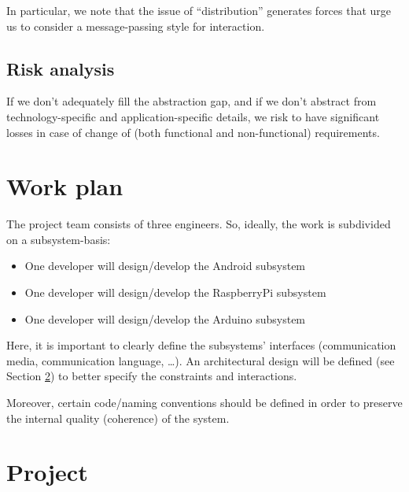 \documentclass{article}
\newcommand{\labelsec}[1]{\label{sec:#1}}
\begin{document}
In particular, we note that the issue of ``distribution'' generates forces that
urge us to consider a message-passing style for
interaction.

\subsection{Risk analysis}

  If we don't adequately fill the abstraction gap, and if we don't abstract
  from technology-specific and application-specific details, we risk to have
  significant losses in case of change of (both functional and non-functional) requirements.
  

\section{Work plan}
\labelsec{wplan}

The project team consists of three engineers. So, ideally, the work is
subdivided on a subsystem-basis:

\begin{itemize}
  \item One developer will design/develop the Android subsystem
  \item One developer will design/develop the RaspberryPi subsystem
  \item One developer will design/develop the Arduino subsystem
\end{itemize}

Here, it is important to clearly define the subsystems' interfaces
(communication media, communication language, \ldots). An architectural design
will be defined (see Section \ref{sec:Project}) to better specify the
constraints and interactions.

Moreover, certain code/naming conventions should be defined in order to preserve
the internal quality (coherence) of the system.

\section{Project}
\labelsec{Project}
\end{document}
